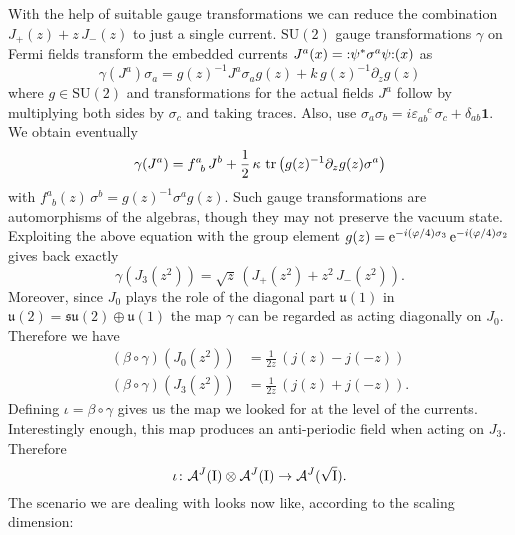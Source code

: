  \bigskip
 With the help of suitable gauge transformations we can reduce
 the combination $J_+(z)+z\,J_-(z)$ to just a single current.
 $\textrm{SU}(2)$ gauge transformations $\gamma$ on
 Fermi fields transform the embedded currents
 $J^a(x)=\wick{\psi^* \sigma^a \psi}(x)$ as
 \[
 \gamma(J^a)\sigma_a=g(z)^{-1} J^a\sigma_a g(z) +
 k\,g(z)^{-1}\partial_z g(z)
 \]
 where $g\in\textrm{SU}(2)$ and 
 transformations for the actual fields $J^a$ follow
 by multiplying both sides by $\sigma_c$ and
 taking traces. Also, use $\sigma_a\sigma_b =
 i\varepsilon_{ab}^{\phantom{ab}c}\,\sigma_c +
 \delta_{ab}\bm{1}$. We obtain eventually
 \begin{equation}
 \label{GTcurrents}
 \gamma(J^a)=f^a_{\phantom{a}b}\,J^b +\frac{1}{2}\,
 \kappa\,\operatorname{tr}\left(g(z)^{-1}\partial_z g(z)\sigma^a\right)
 \end{equation}
 with $f^a_{\phantom{a}b}(z)\,\sigma^b=g(z)^{-1}\sigma^a g(z)$.
 Such gauge transformations are automorphisms of the
 algebras, though they may not preserve the vacuum state.
 Exploiting the above equation with the group element
 $g(z)=\operatorname{e}^{-i(\varphi/4)\sigma_3}
 \operatorname{e}^{-i(\varphi/4)\sigma_2}$
 gives back exactly
 \[
 \gamma\left(J_3(z^2)\right)=\sqrt{z}\,
 \left(J_+(z^2)+z^2\,J_-(z^2)\right).
 \]
 Moreover, since $J_0$ plays the role of the diagonal
 part $\mathfrak{u(1)}$ in $\mathfrak{u(2)}=\mathfrak{su(2)}
 \oplus \mathfrak{u(1)}$ the map $\gamma$
 can be regarded as acting diagonally on $J_0$. Therefore
 we have
 \begin{align}
 \label{J0J3}
 \left(\beta\circ\gamma\right)\left(J_0(z^2)\right)&=\frac{1}{2z}\,
 \left(j(z)-j(-z)\right)\\
 \left(\beta\circ\gamma\right)\left(J_3(z^2)\right)&=\frac{1}{2z}\,
 \left(j(z)+j(-z)\right).
 \end{align}
 Defining $\iota=\beta\circ\gamma$ gives us the map we looked for
 at the level of the currents. Interestingly enough, this map
 produces an anti-periodic field when acting on $J_3$. Therefore
 \[
 \iota\colon\mathcal{A}^J(\textrm{I})\otimes\mathcal{A}^J(\textrm{I})\to
 \mathcal{A}^J(\sqrt{\textrm{I}}).
 \]
 The scenario we are dealing with looks now like, according 
 to the scaling dimension:
